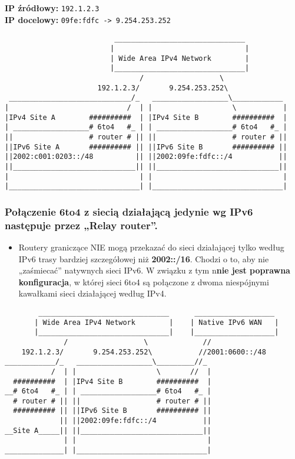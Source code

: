 \documentclass[../sk-egzamin.tex]{subfiles}
\begin{document}
\textbf{IP źródłowy:} \texttt{192.1.2.3} \\
\textbf{IP docelowy:} \texttt{09fe:fdfc -> 9.254.253.252}

\pagebreak

\begin{verbatim}
                          _______________________________
                         |                               |
                         | Wide Area IPv4 Network        |
                         |_______________________________|
                                /                  \
                      192.1.2.3/       9.254.253.252\
 _____________________________/_   __________________\____________
|                            /  | |                   \           |
|IPv4 Site A        ##########  | |IPv4 Site B        ##########  |
| __________________# 6to4   #_ | | __________________# 6to4   #_ |
||                  # router # || ||                  # router # ||
||IPv6 Site A       ########## || ||IPv6 Site B       ########## ||
||2002:c001:0203::/48          || ||2002:09fe:fdfc::/4           ||
||_____________________________|| ||_____________________________||
|                               | |                               |
|_______________________________| |_______________________________|
\end{verbatim}

\subsubsection*{Połączenie 6to4 z siecią działającą jedynie wg IPv6
następuje przez „Relay router”.}

\begin{itemize}
    \item Routery graniczące NIE mogą przekazać do sieci działającej tylko
    według IPv6 trasy bardziej szczegółowej niż \textbf{2002::/16}.
    Chodzi o to, aby nie „zaśmiecać” natywnych sieci IPv6.
    W związku z tym n\textbf{nie jest poprawna konfiguracja}, w której sieci
    6to4 są połączone z dwoma niespójnymi kawałkami sieci działającej według
    IPv4.
\end{itemize}

\begin{verbatim}
        _______________________________      ___________________
       | Wide Area IPv4 Network        |    | Native IPv6 WAN   |
       |_______________________________|    |___________________|
              /                  \             //
    192.1.2.3/       9.254.253.252\           //2001:0600::/48
____________/_   __________________\_________//_
           /  | |                   \       //  |
  ##########  | |IPv4 Site B        ##########  |
__# 6to4   #_ | | __________________# 6to4   #_ |
  # router # || ||                  # router # ||
  ########## || ||IPv6 Site B       ########## ||
             || ||2002:09fe:fdfc::/4           ||
__Site A_____|| ||_____________________________||
              | |                               |
______________| |_______________________________|
\end{verbatim}


\pagebreak
\end{document}

